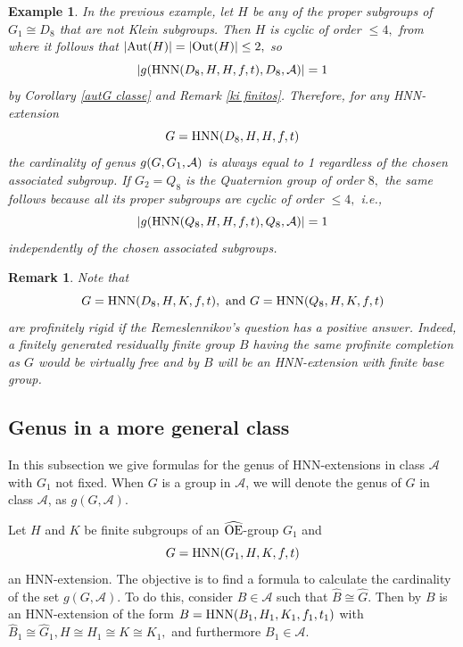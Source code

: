 \documentclass[a4paper,12pt]{article}
\newtheorem{deff}[thm]{Definition}
\newcommand{\A}{{\cal A}}
\newcommand{\Oe}{\rm \widehat{OE}}
\def\aut {{\rm Aut}}
\def\out {{\rm Out}}
\def\hnn {{\rm HNN}}
\newtheorem{exa}[thm]{Example}
\newtheorem{rem}[thm]{Remark}
\begin{document}
{\begin{exa}\label{diedral over cyclic}
In the previous example, let $H$ be any of the proper subgroups of $G_1 \cong D_8$ that are not Klein subgroups. Then $H$ is cyclic of order $\leq 4,$ from where it follows that $|\aut(H)|=|\out(H) | \leq 2,$ so $$|g(\hnn(D_8, H, H, f,t), D_8,\A)|=1$$ by Corollary \ref{autG classe} and Remark \ref{ki finitos}.  Therefore, for any HNN-extension $$G=\hnn(D_8, H, H, f,t)$$ the cardinality of  genus $g(G, G_1,\A)$ is always equal to 1 regardless of the chosen associated subgroup. If $G_2=Q_8$ is the Quaternion group of order $8,$ the same follows because all its proper subgroups are cyclic of order $\leq 4,$ i.e., $$|g(\hnn(Q_8, H, H, f,t), Q_8,\A)|=1$$ independently of the chosen associated subgroups.     
\end{exa}

\begin{rem} Note that $$G=\hnn(D_8, H, K, f,t),\  {\rm and}\  G=\hnn(Q_8, H, K, f,t)$$ are  profinitely rigid if the Remeslennikov's question has a positive answer. Indeed,  a finitely generated residually finite group $B$  having the same profinite completion as $G$ would be virtually free and by \cite[Theorem 1.1]{BPZ} $B$ will be an HNN-extension with finite base group.
\end{rem}



\subsection{Genus in a more general class} \label{general section}


 In this subsection we give formulas  for the genus of HNN-extensions in class $\mathcal{A}$ with $G_1$ not fixed. When $G$ is a group in $\mathcal{A}$,  we will denote the genus of $G$ in class $\mathcal{A}$, as $g(G, \mathcal{A}).$

Let $H$ and $K$ be finite subgroups of an $\Oe$-group $G_1$ and $$G=\hnn(G_1, H, K, f, t)$$ an HNN-extension. The objective  is to find a formula to calculate the cardinality of the set $g(G, \mathcal{A}).$
To do this, consider $B\in \mathcal{A}$ such that $\widehat B\cong \widehat G$. Then by \cite[Theorem 1.1]{BPZ} $B$ is an HNN-extension of the form $B=\hnn(B_1, H_1, K_1, f_1, t_1)$ with $\widehat B_1\cong \widehat G_1, H \cong H_1\cong K \cong K_1,$ and furthermore $B_1 \in \mathcal{A}$.




}
\end{document}
